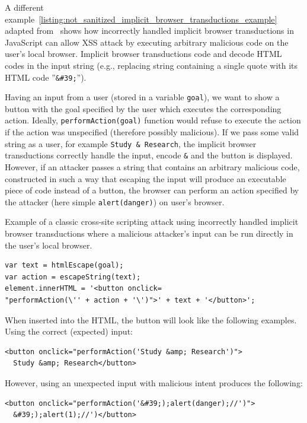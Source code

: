 A different example~\ref{listing:not_sanitized_implicit_browser_transductions_example} adapted from~\cite{kern14} shows how incorrectly handled implicit browser transductions in JavaScript can allow XSS attack by executing arbitrary malicious code on the user's local browser.
Implicit browser transductions code and decode HTML codes in the input string (e.g., replacing string containing a single quote with its HTML code ''\texttt{\&\#39;}'').

Having an input from a user (stored in a variable \texttt{goal}), we want to show a button with the goal specified by the user which executes the corresponding action. Ideally, \texttt{performAction(goal)} function would refuse to execute the action if the action was unspecified (therefore possibly malicious).
If we pass some valid string as a user, for example \texttt{Study \& Research}, the implicit browser transductions correctly handle the input, encode \texttt{\&} and the button is displayed.
However, if an attacker passes a string that contains an arbitrary malicious code, constructed in such a way that escaping the input will produce an executable piece of code instead of a button, the browser can perform an action specified by the attacker (here simple \texttt{alert(danger)}) on user's browser.

\begin{listing}[!ht]
\caption{Example of a classic cross-site scripting attack using incorrectly handled implicit browser transductions where a malicious attacker's input can be run directly in the user's local browser.}
\label{listing:not_sanitized_implicit_browser_transductions_example}

    \begin{verbatim}
var text = htmlEscape(goal);
var action = escapeString(text);
element.innerHTML = '<button onclick=
"performAction(\'' + action + '\')">' + text + '</button>';
    \end{verbatim}

    When inserted into the HTML, the button will look like the following examples.
    Using the correct (expected) input:
    \begin{verbatim}
<button onclick="performAction('Study &amp; Research')">
  Study &amp; Research</button>
    \end{verbatim}

    However, using an unexpected input with malicious intent produces the following:

    \begin{verbatim}
<button onclick="performAction('&#39;);alert(danger);//')">
  &#39;);alert(1);//')</button>
    \end{verbatim}
\end{listing}

